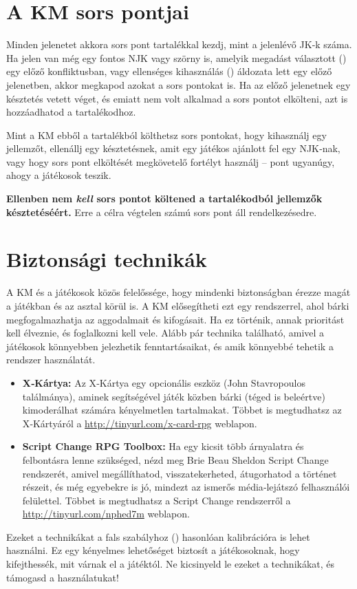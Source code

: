 \section{A KM sors pontjai}

Minden jelenetet akkora sors pont tartalékkal kezdj, mint a jelenlévő JK‑k száma. Ha jelen van még egy fontos NJK vagy szörny is, amelyik megadást választott () egy előző konfliktusban, vagy ellenséges kihasználás () áldozata lett egy előző jelenetben, akkor megkapod azokat a sors pontokat is. Ha az előző jelenetnek egy késztetés vetett véget, és emiatt nem volt alkalmad a sors pontot elkölteni, azt is hozzáadhatod a tartalékodhoz.


Mint a KM ebből a tartalékból költhetsz sors pontokat, hogy kihasználj egy jellemzőt, ellenállj egy késztetésnek, amit egy játékos ajánlott fel egy NJK‑nak, vagy hogy sors pont elköltését megkövetelő fortélyt használj – pont ugyanúgy, ahogy a játékosok teszik.

\textbf{Ellenben nem \emph{kell} sors pontot költened a tartalékodból jellemzők késztetéséért.} Erre a célra végtelen számú sors pont áll rendelkezésedre.

\section{Biztonsági technikák}

A KM és a játékosok közös felelőssége, hogy mindenki biztonságban érezze magát a játékban és az asztal körül is. A KM elősegítheti ezt egy rendszerrel, ahol bárki megfogalmazhatja az aggodalmait és kifogásait. Ha ez történik, annak prioritást kell élveznie, és foglalkozni kell vele. Alább pár technika található, amivel a játékosok könnyebben jelezhetik fenntartásaikat, és amik könnyebbé tehetik a rendszer használatát.

\begin{itemize}
    \item \textbf{X‑Kártya:} Az X‑Kártya egy opcionális eszköz (John Stavropoulos találmánya), aminek segítségével játék közben bárki (téged is beleértve) kimoderálhat számára kényelmetlen tartalmakat. Többet is megtudhatsz az X‑Kártyáról a \url{http://tinyurl.com/x-card-rpg} weblapon.
    \item \textbf{Script Change RPG Toolbox:} Ha egy kicsit több árnyalatra és felbontásra lenne szükséged, nézd meg Brie Beau Sheldon Script Change rendszerét, amivel megállíthatod, visszatekerheted, átugorhatod a történet részeit, és még egyebekre is jó, mindezt az ismerős média‑lejátszó felhasználói felülettel. Többet is megtudhatsz a Script Change rendszerről a \url{http://tinyurl.com/nphed7m} weblapon.
\end{itemize}

Ezeket a technikákat a fals szabályhoz () hasonlóan kalibrációra is lehet használni. Ez egy kényelmes lehetőséget biztosít a játékosoknak, hogy kifejthessék, mit várnak el a játéktól. Ne kicsinyeld le ezeket a technikákat, és támogasd a használatukat!
